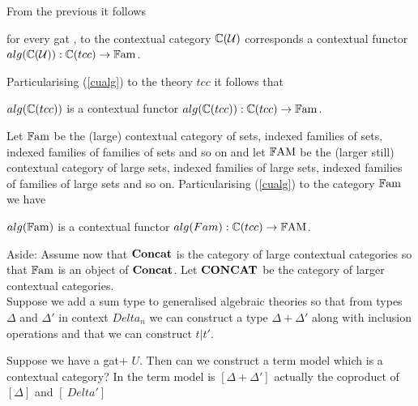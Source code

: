 \begin{oldtt}
\note
From the previous it follows 
\begin{pointeq}
\label{cualg}
for every gat \gat[U], to the contextual category $\CofU$ corresponds a contextual functor
   $\alg{\CofU} :\ccat[C](tcc) \morph \Fam$. \\
\end{pointeq} 

\note Particularising (\ref{cualg}) to the theory $tcc$ it follows that
\begin{pointeq}
  $\alg{\ccat[C](tcc)}$ is a contextual functor   $\alg{\ccat[C](tcc)} :\ccat[C](tcc) \morph \Fam$.
\end{pointeq}

\note
Let $\Fam$ be the (large) contextual category of sets, indexed families of sets, indexed families of families of sets and so on and
let $\FAM$ be the (larger still) contextual category of large sets, indexed families of large sets, indexed families of families of large sets and so on.
Particularising (\ref{cualg}) to the category $\Fam$ we have
\begin{pointeq}
  \label{inducedalgebra}
  $\alg{\Fam}$ is a contextual functor   $\alg{Fam} :\ccat[C](tcc) \morph \FAM$. 
\end{pointeq}
 
\note
Aside: Assume now that $\catofccs$ is the category of large contextual categories so that $\Fam$ is an object of $\catofccs$. 
Let $\catoflargerccs$ be the category of larger contextual categories. \\



\note Suppose we add a sum type to generalised algebraic theories so that from
types $\Delta$ and $\Delta'$ in context $Delta_n$ we can construct a type $\Delta + \Delta'$
along with inclusion operations and that we can construct $t | t'$. 

\note Suppose we have a gat+ $U$. Then can we construct a term model which is a contextual category?
In the term model is $[\Delta + \Delta']$ actually the coproduct of $[\Delta]$ and $[\
Delta'] $
\end{oldtt}

